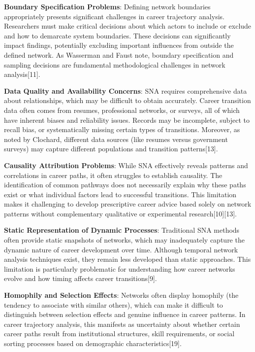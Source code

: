 \documentclass[
  letterpaper,
  DIV=11,
  numbers=noendperiod]{scrartcl}
\begin{document}
\textbf{Boundary Specification Problems}: Defining network boundaries
appropriately presents significant challenges in career trajectory
analysis. Researchers must make critical decisions about which actors to
include or exclude and how to demarcate system boundaries. These
decisions can significantly impact findings, potentially excluding
important influences from outside the defined network. As Wasserman and
Faust note, boundary specification and sampling decisions are
fundamental methodological challenges in network analysis{[}11{]}.

\textbf{Data Quality and Availability Concerns}: SNA requires
comprehensive data about relationships, which may be difficult to obtain
accurately. Career transition data often comes from resumes,
professional networks, or surveys, all of which have inherent biases and
reliability issues. Records may be incomplete, subject to recall bias,
or systematically missing certain types of transitions. Moreover, as
noted by Clochard, different data sources (like resumes versus
government surveys) may capture different populations and transition
patterns{[}13{]}.

\textbf{Causality Attribution Problems}: While SNA effectively reveals
patterns and correlations in career paths, it often struggles to
establish causality. The identification of common pathways does not
necessarily explain why these paths exist or what individual factors
lead to successful transitions. This limitation makes it challenging to
develop prescriptive career advice based solely on network patterns
without complementary qualitative or experimental
research{[}10{]}{[}13{]}.

\textbf{Static Representation of Dynamic Processes}: Traditional SNA
methods often provide static snapshots of networks, which may
inadequately capture the dynamic nature of career development over time.
Although temporal network analysis techniques exist, they remain less
developed than static approaches. This limitation is particularly
problematic for understanding how career networks evolve and how timing
affects career transitions{[}9{]}.

\textbf{Homophily and Selection Effects}: Networks often display
homophily (the tendency to associate with similar others), which can
make it difficult to distinguish between selection effects and genuine
influence in career patterns. In career trajectory analysis, this
manifests as uncertainty about whether certain career paths result from
institutional structures, skill requirements, or social sorting
processes based on demographic characteristics{[}19{]}.
\end{document}
